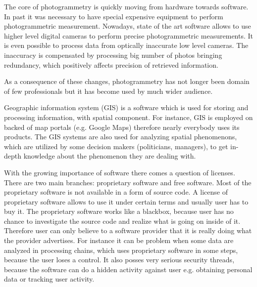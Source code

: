 \documentclass[a4paper,12pt]{article}
\begin{document}

The core of photogrammetry is quickly moving  from  hardware towards software. In past it was necessary to have special 
expensive equipment to perform photogrammetric measurement. Nowadays,
 state of the art software allows to use higher level digital cameras to perform precise photogrammetric measurements. 
  It is even possible to process data from optically inaccurate low level cameras.
 The inaccuracy is compensated by processing big number of photos bringing redundancy, 
 which positively affects precision of retrieved information.
 
As a consequence of these changes, photogrammetry has not longer been domain of few professionals but it has 
become used by much wider audience. 


Geographic information system (GIS) is a software which is used for storing and processing information,
with spatial component. For instance,  GIS is employed on backed of map portals (e.g. Google Maps) therefore nearly 
everybody uses its products. 
The GIS systems are also used for analyzing spatial phenomenons, which
are utilized by some decision makers (politicians, managers), to get in-depth knowledge about the 
phenomenon they are dealing with.



With the growing importance of software there comes a question of licenses. There are two 
main branches: proprietary software and free software. Most of the proprietary software is not available in 
a form of source code. A license of proprietary software allows to use it under certain terms and usually user 
has to buy it. The proprietary software works like a blackbox, because user has no chance to investigate the source 
code and realize what is going on inside of it. Therefore user can only believe to a software provider
that it is really doing what the provider advertises. 
For instance it can be problem when some data are analyzed in processing chains, which uses proprietary software in some steps,
because the user loses a control.
It also posses very serious security threads, because the software can do a hidden activity against user
e.g. obtaining personal data or tracking user activity.
\end{document}
